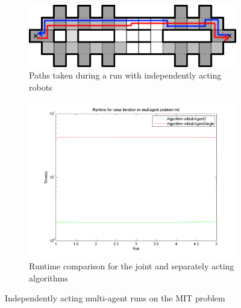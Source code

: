 \documentclass[10pt,a4paper]{article}
\begin{document}
\begin{figure}
        \centering
        \begin{subfigure}{0.4\textwidth}
                \includegraphics[width=\textwidth]{todo/mit/path-single.png}
                \caption{Paths taken during a run with independently acting robots}
                \label{fig:single_mit_part1}
                \hspace{10pt}
        \end{subfigure}
        \quad
        \begin{subfigure}{0.48\textwidth}
        		\includegraphics[width=\textwidth]{todo/mit/timings_vi-2.png}
                \caption{Runtime comparison for the joint and separately acting algorithms}
                \label{fig:single_mi_part2}
                \hspace{-10pt}
        \end{subfigure}
        \caption{Independently acting multi-agent runs on the MIT problem}
        \label{fig:single_mit}
\end{figure}
\end{document}
